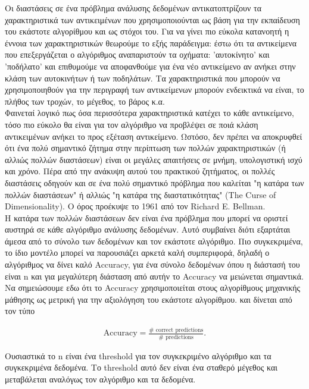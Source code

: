 \documentclass[12pt]{article}
\begin{document}
Οι διαστάσεις σε ένα πρόβλημα ανάλυσης δεδομένων αντικατοπτρίζουν τα χαρακτηριστικά των αντικειμένων που χρησιμοποιούνται ως βάση για την εκπαίδευση του εκάστοτε αλγορίθμου και ως στόχοι του. Για να γίνει πιο εύκολα κατανοητή η έννοια των χαρακτηριστικών θεωρούμε το εξής παράδειγμα: έστω ότι τα αντικείμενα που επεξεργάζεται ο αλγόριθμος αναπαριστούν τα οχήματα: 'αυτοκίνητο' και 'ποδήλατο' και επιθυμούμε να αποφανθούμε για ένα νέο αντικείμενο αν ανήκει στην κλάση των αυτοκινήτων ή των ποδηλάτων. Τα χαρακτηριστικά που μπορούν να χρησιμοποιηθούν για την περιγραφή των αντικείμενων μπορούν ενδεικτικά να είναι, το πλήθος των τροχών, το μέγεθος, το βάρος κ.α. \\

Φαινεταί λογικό πως όσα περισσότερα χαρακτηριστικά κατέχει το κάθε αντικείμενο, τόσο πιο εύκολο θα είναι για τον αλγόριθμο να προβλέψει σε ποιά κλάση αντικειμένων ανήκει το προς εξέταση αντικείμενο. Ωστόσο, δεν πρέπει να αποκρυφθεί ότι ένα πολύ σημαντικό ζήτημα στην περίπτωση των πολλών χαρακτηριστικών (ή αλλιώς πολλών διαστάσεων) είναι οι μεγάλες απαιτήσεις σε μνήμη, υπολογιστική ισχύ και χρόνο. Πέρα από την ανάκυψη αυτού του πρακτικού ζητήματος, οι πολλές διαστάσεις οδηγούν και σε ένα πολύ σημαντικό πρόβλημα που καλείται "η κατάρα των πολλών διαστάσεων" ή αλλιώς "η κατάρα της διαστατικότητας" (The Curse of Dimensionality). Ο όρος προέκυψε το 1961 από τον Richard E. Bellman. \\

Η κατάρα των πολλών διαστάσεων δεν είναι ένα πρόβλημα που μπορεί να οριστεί αυστηρά σε κάθε αλγόριθμο ανάλυσης δεδομένων. Αυτό συμβαίνει διότι εξαρτάται άμεσα από το σύνολο των δεδομένων και τον εκάστοτε αλγόριθμο. Πιο συγκεκριμένα, το ίδιο μοντέλο μπορεί να παρουσιάζει αρκετά καλή συμπεριφορά, δηλαδή ο αλγόριθμος να δίνει καλό Accuracy, για ένα σύνολο δεδομένων όπου η διάστασή του είναι n και για μεγαλύτερη διάσταση από αυτήν το Accuracy να μειώνεται σημαντικά. Να σημειώσουμε εδω ότι το Accuracy χρησιμοποιείται στους αλγορίθμους μηχανικής μάθησης ως μετρική για την αξιολόγηση του εκάστοτε αλγορίθμου. και δίνεται από τον τύπο

\begin{align*}
	\text{Accuracy} = \frac{\# \text{ correct predictions} }{\# \text{ predictions}}.
\end{align*}

Ουσιαστικά το n είναι ένα threshold για τον συγκεκριμένο αλγόριθμο και τα συγκεκριμένα δεδομένα. Το threshold αυτό δεν είναι ένα σταθερό μέγεθος και μεταβάλεται αναλόγως τον αλγόριθμο και τα δεδομένα. \\
\end{document}
